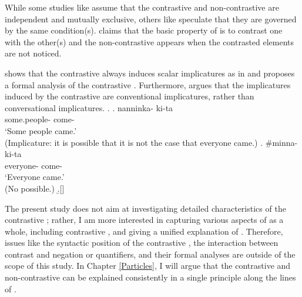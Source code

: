 While some studies like  assume that
the contrastive  and non-contrastive  are independent and mutually exclusive,
others like  speculate that
they are governed by the same condition(s).
claims that the basic property of  is to contrast one with the other(s) and
the non-contrastive  appears when the contrasted elements are not noticed.



shows that the contrastive  always induces scalar implicatures as in \Next[a] and
proposes a formal analysis of the contrastive .
Furthermore,
 argues that the implicatures induced by the contrastive 
are conventional implicatures, rather than conversational implicatures.
%
\ex.
 \ag. nanninka- ki-ta \\
      some.people- come- \\
      `Some people came.'\\
      (Implicature: it is possible that it is not the case that
      everyone came.)
  \bg. \#minna- ki-ta \\
        everyone- come- \\
        `Everyone came.'\\
        (No  possible.)
  \b.[] \hfill{\cite[36]{hara06}}


The present study does not aim at investigating detailed characteristics of
the contrastive ;
rather, I am more interested in capturing various aspects of  as a whole,
including contrastive ,
and giving a unified explanation of .
Therefore, issues like the syntactic position of the contrastive ,
the interaction between contrast and negation or quantifiers,
and their formal analyses
are outside of the scope of this study.
In Chapter \ref{Particles},
I will argue that the contrastive and non-contrastive  can be explained consistently in a single principle
along the lines of .

